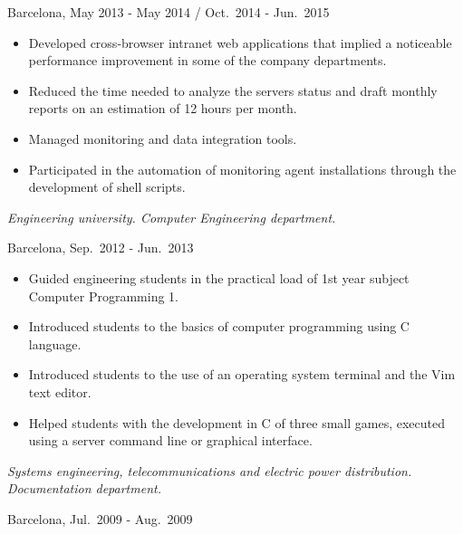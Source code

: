 \begin{description}[itemsep=15pt]
        Barcelona, May 2013 - May 2014 / Oct.\ 2014 - Jun.\ 2015
        \begin{itemize}[itemsep=0pt]
            \item Developed cross-browser intranet web applications that implied a noticeable performance improvement in some of the company departments.
            \item Reduced the time needed to analyze the servers status and draft monthly reports on an estimation of 12 hours per month.
            \item Managed monitoring and data integration tools.
            \item Participated in the automation of monitoring agent installations through the development of shell scripts.
        \end{itemize}

    \item[\href{http://www.salleurl.edu}{La Salle Campus}, Teaching Assistant in Computer Programming 1] \hfill

        \emph{Engineering university. Computer Engineering department.}

        Barcelona, Sep.\ 2012 - Jun.\ 2013
        \begin{itemize}[itemsep=0pt]
            \item Guided engineering students in the practical load of 1st year subject Computer Programming 1.
            \item Introduced students to the basics of computer programming using C language.
            \item Introduced students to the use of an operating system terminal and the Vim text editor.
            \item Helped students with the development in C of three small games, executed using a server command line or graphical interface.
        \end{itemize}

    \item[\href{http://www.itc2.com}{ITC-2}, Technical Assistant] \hfill

        \emph{Systems engineering, telecommunications and electric power distribution. Documentation department.}

        Barcelona, Jul.\ 2009 - Aug.\ 2009


\end{description}

